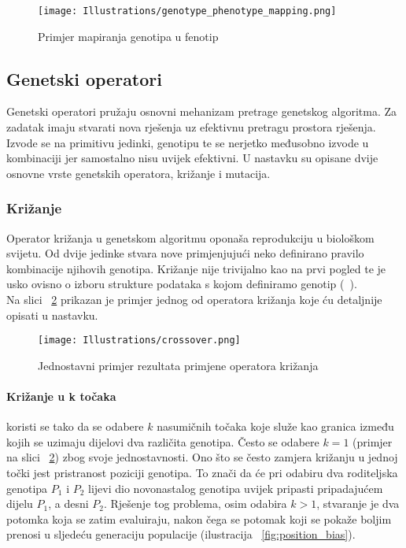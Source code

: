\begin{figure}
	\centering
	\texttt{[image: Illustrations/genotype\_phenotype\_mapping.png]}
	\caption{Primjer mapiranja genotipa u fenotip}
	\label{fig:genotype_phenotype_map}
\end{figure}

\subsection{Genetski operatori}
Genetski operatori pružaju osnovni mehanizam pretrage genetskog algoritma.
Za zadatak imaju stvarati nova rješenja uz efektivnu pretragu prostora rješenja.
Izvode se na primitivu jedinki, genotipu te se nerjetko međusobno izvode u kombinaciji jer samostalno nisu uvijek efektivni.
U nastavku su opisane dvije osnovne vrste genetskih operatora, križanje i mutacija.

\subsubsection{Križanje}
Operator križanja u genetskom algoritmu oponaša reprodukciju u biološkom svijetu.
Od dvije jedinke stvara nove primjenjujući neko definirano pravilo kombinacije njihovih genotipa.
Križanje nije trivijalno kao na prvi pogled te je usko ovisno o izboru strukture podataka s kojom definiramo genotip (~\cite{wong2015evolutionary}). \\
Na slici ~\ref{fig:crossover} prikazan je primjer jednog od operatora križanja koje ću detaljnije opisati u nastavku.

\begin{figure}
	\texttt{[image: Illustrations/crossover.png]}
	\caption{Jednostavni primjer rezultata primjene operatora križanja}
	\label{fig:crossover}
\end{figure}

\paragraph{Križanje u k točaka}
koristi se tako da se odabere $k$ nasumičnih točaka koje služe kao granica između kojih se uzimaju dijelovi dva različita genotipa.
Često se odabere $k = 1$ (primjer na slici ~\ref{fig:crossover}) zbog svoje jednostavnosti.
Ono što se često zamjera križanju u jednoj točki jest pristranost poziciji genotipa.
To znači da će pri odabiru dva roditeljska genotipa $P_1$ i $P_2$ lijevi dio novonastalog genotipa uvijek pripasti pripadajućem dijelu $P_1$, a desni $P_2$.
Rješenje tog problema, osim odabira $k > 1$, stvaranje je dva potomka koja se zatim evaluiraju, nakon čega se potomak koji se pokaže boljim prenosi u sljedeću generaciju populacije (ilustracija ~\ref{fig:position_bias}).

